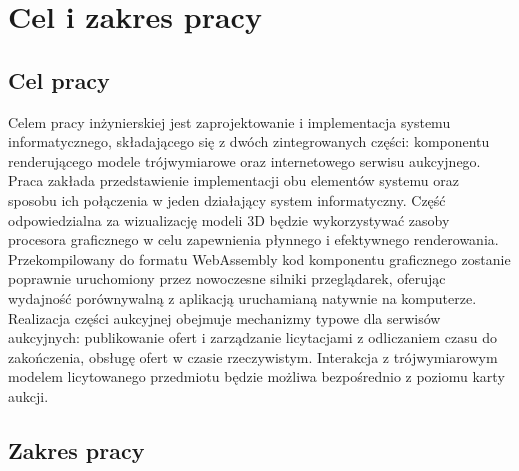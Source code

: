 \section{Cel i zakres pracy}

\subsection{Cel pracy}

Celem pracy inżynierskiej jest zaprojektowanie i implementacja systemu informatycznego, składającego się z dwóch zintegrowanych części: komponentu renderującego modele trójwymiarowe oraz internetowego serwisu aukcyjnego. Praca zakłada przedstawienie implementacji obu elementów systemu oraz sposobu ich połączenia w jeden działający system informatyczny. Część odpowiedzialna za wizualizację modeli 3D będzie wykorzystywać zasoby procesora graficznego w celu zapewnienia płynnego i efektywnego renderowania. Przekompilowany do formatu WebAssembly kod komponentu graficznego zostanie poprawnie uruchomiony przez nowoczesne silniki przeglądarek, oferując wydajność porównywalną z aplikacją uruchamianą natywnie na komputerze. Realizacja części aukcyjnej obejmuje mechanizmy typowe dla serwisów aukcyjnych: publikowanie ofert i zarządzanie licytacjami z odliczaniem czasu do zakończenia, obsługę ofert w czasie rzeczywistym. Interakcja z trójwymiarowym modelem licytowanego przedmiotu będzie możliwa bezpośrednio z poziomu karty aukcji.

\subsection{Zakres pracy}

